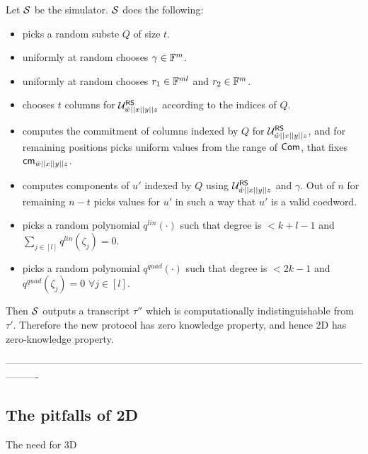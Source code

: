 Let $\mathcal{S}$ be the simulator. $\mathcal{S}$ does the following:
\begin{itemize}
	\item  picks a random subste $Q$ of size $t$.
	\item  uniformly at random chooses $\gamma \in \mathbb{F}^m$.
	\item  uniformly at random chooses $r_1 \in \mathbb{F}^{ml}$ and $r_2 \in \mathbb{F}^m$.
	\item  chooses $t$ columns for $\mathcal{U}^{\mathsf{RS}}_{\hat{w}||x||y||z}$ according to the indices of $Q$.
	\item  computes the commitment of columns indexed by $Q$ for $\mathcal{U}^{\mathsf{RS}}_{\hat{w}||x||y||z}$, and for remaining positions picks uniform values from the range of $\mathsf{Com}$, that fixes $\mathsf{cm}_{\hat{w}||x||y||z}$.
	\item  computes components of $u'$ indexed by $Q$ using $\mathcal{U}^{\mathsf{RS}}_{\hat{w}||x||y||z}$ and $\gamma$. Out of $n$ for remaining $n-t$ picks values for $u'$ in such a way that $u'$ is a valid coedword.
	\item  picks a random polynomial $q^{lin}(\cdot)$ such that degree is $<k+l-1$ and $\sum_{j\in [l]} q^{lin}(\zeta_j) = 0$.
	\item  picks a random polynomial $q^{quad}(\cdot)$ such that degree is $<2k-1$ and $q^{quad}(\zeta_j) = 0$ $\forall j\in [l]$.
\end{itemize} 
Then $\mathcal{S}$ outputs a transcript $\tau''$ which is computationally indistinguishable from $\tau'$. Therefore the new protocol has zero knowledge property, and hence \name2D has zero-knowledge property.

----------------------------------------------------------------------------------------------------------------------


\subsection{The pitfalls of 2D}
The need for 3D